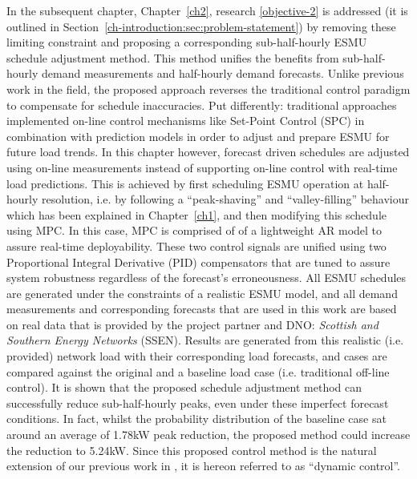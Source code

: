 In the subsequent chapter, Chapter~\ref{ch2}, research \ref{objective-2} is addressed (it is outlined in Section~\ref{ch-introduction:sec:problem-statement}) by removing these limiting constraint and proposing a corresponding sub-half-hourly ESMU schedule adjustment method.
This method unifies the benefits from sub-half-hourly demand measurements and half-hourly demand forecasts.
Unlike previous work in the field, the proposed approach reverses the traditional control paradigm to compensate for schedule inaccuracies.
Put differently: traditional approaches implemented on-line control mechanisms like Set-Point Control (SPC) in combination with prediction models in order to adjust and prepare ESMU for future load trends.
In this chapter however, forecast driven schedules are adjusted using on-line measurements instead of supporting on-line control with real-time load predictions.
This is achieved by first scheduling ESMU operation at half-hourly resolution, i.e. by following a ``peak-shaving'' and ``valley-filling'' behaviour which has been explained in Chapter~\ref{ch1}, and then modifying this schedule using MPC.
In this case, MPC is comprised of of a lightweight AR model to assure real-time deployability.
These two control signals are unified using two Proportional Integral Derivative (PID) compensators that are tuned to assure system robustness regardless of the forecast's erroneousness.
All ESMU schedules are generated under the constraints of a realistic ESMU model, and all demand measurements and corresponding forecasts that are used in this work are based on real data that is provided by the project partner and DNO: \textit{Scottish and Southern Energy Networks} (SSEN).
Results are generated from this realistic (i.e. provided) network load with their corresponding load forecasts, and cases are compared against the original and a baseline load case (i.e. traditional off-line control).
It is shown that the proposed schedule adjustment method can successfully reduce sub-half-hourly peaks, even under these imperfect forecast conditions.
In fact, whilst the probability distribution of the baseline case sat around an average of 1.78kW peak reduction, the proposed method could increase the reduction to 5.24kW.
Since this proposed control method is the natural extension of our previous work in \cite{Zangs2016}, it is hereon referred to as ``dynamic control''.

